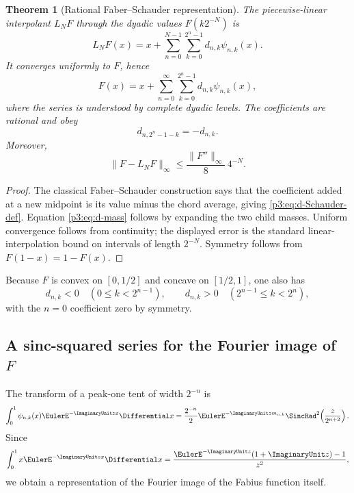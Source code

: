 \documentclass[11pt]{article}
\newtheorem{theorem}{Theorem}[section]
\theoremstyle{definition}
\theoremstyle{remark}
\begin{document}
\begin{theorem}[Rational Faber--Schauder representation]
\label{p3:thm:Faber-Schauder-F}
The piecewise-linear interpolant $L_NF$ through the dyadic values
$F(k2^{-N})$ is
\begin{equation}\label{p3:eq:LN-F-Schauder}
 L_NF(x)=x+\sum_{n=0}^{N-1}\sum_{k=0}^{2^n-1}
 d_{n,k}\psi_{n,k}(x).
\end{equation}
It converges uniformly to $F$, hence
\begin{equation}\label{p3:eq:F-Schauder-series}
 F(x)=x+\sum_{n=0}^\infty\sum_{k=0}^{2^n-1}
 d_{n,k}\psi_{n,k}(x),
\end{equation}
where the series is understood by complete dyadic levels.  The coefficients are
rational and obey
\begin{equation}\label{p3:eq:d-antisymmetry}
 d_{n,2^n-1-k}=-d_{n,k}.
\end{equation}
Moreover,
\begin{equation}\label{p3:eq:F-interpolation-error}
 \|F-L_NF\|_\infty
 \le\frac{\|F''\|_\infty}{8}\,4^{-N}.
\end{equation}
\end{theorem}

\begin{proof}
The classical Faber--Schauder construction says that the coefficient added at a
new midpoint is its value minus the chord average, giving
\eqref{p3:eq:d-Schauder-def}.  Equation \eqref{p3:eq:d-mass} follows by expanding the
two child masses.  Uniform convergence follows from continuity; the displayed
error is the standard linear-interpolation bound on intervals of length
$2^{-N}$.  Symmetry follows from $F(1-x)=1-F(x)$.
\end{proof}

Because $F$ is convex on $[0,1/2]$ and concave on $[1/2,1]$, one also has
\begin{equation}\label{p3:eq:d-sign}
 d_{n,k}<0\quad(0\le k<2^{n-1}),
 \qquad
 d_{n,k}>0\quad(2^{n-1}\le k<2^n),
\end{equation}
with the $n=0$ coefficient zero by symmetry.

\subsection[A sinc-squared series for the Fourier image of F]{A sinc-squared series for the Fourier image of $F$}

The transform of a peak-one tent of width $2^{-n}$ is
\begin{equation}\label{p3:eq:tent-transform}
 \int_0^1\psi_{n,k}(x)\EulerE^{-\ImaginaryUnit zx}\Differential x
 =\frac{2^{-n}}{2}\EulerE^{-\ImaginaryUnit z m_{n,k}}
 \SincRad^2\!\left(\frac{z}{2^{n+2}}\right).
\end{equation}
Since
\begin{equation}\label{p3:eq:x-transform}
 \int_0^1x\EulerE^{-\ImaginaryUnit zx}\Differential x
 =\frac{\EulerE^{-\ImaginaryUnit z}(1+\ImaginaryUnit z)-1}{z^2},
\end{equation}
we obtain a representation of the Fourier image of the Fabius function itself.
\end{document}
